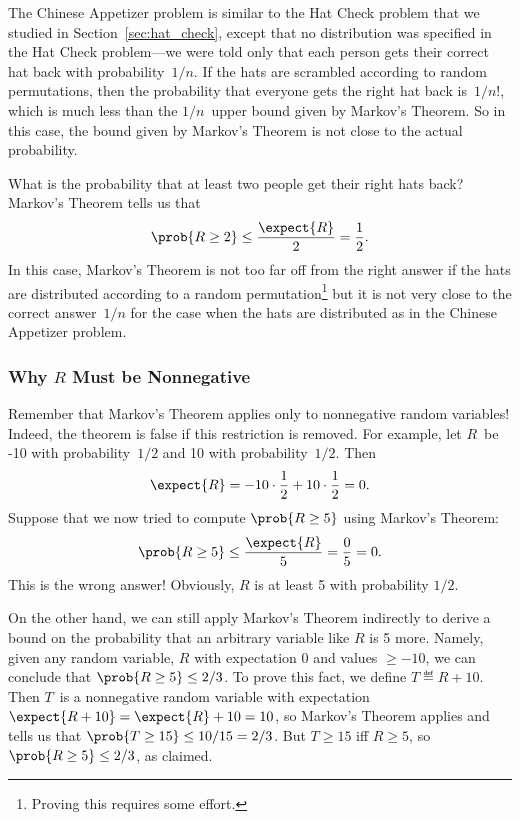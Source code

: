 The Chinese Appetizer problem is similar to the Hat Check problem that
we studied in Section~\ref{sec:hat_check}, except that no distribution
was specified in the Hat Check problem---we were told only that each
person gets their correct hat back with probability~$1/n$.  If the
hats are scrambled according to random permutations, then the
probability that everyone gets the right hat back is~$1/n!$, which is
much less than the $1/n$~upper bound given by Markov's Theorem.  So in
this case, the bound given by Markov's Theorem is not close to the
actual probability.

What is the probability that at least two people get their right hats
back?  Markov's Theorem tells us that
\begin{equation*}
    \prob{R \ge 2} \le \frac{\expect{R}}{2} = \frac{1}{2}.
\end{equation*}
In this case, Markov's Theorem is not too far off from the right
answer if the hats are distributed according to a random
permutation\footnote{Proving this requires some effort.} but it is not
very close to the correct answer~$1/n$ for the case when the hats are
distributed as in the Chinese Appetizer problem.

\subsubsection{Why $R$ Must be Nonnegative}

Remember that Markov's Theorem applies only to nonnegative random
variables!  Indeed, the theorem is false if this restriction is
removed.  For example, let $R$~be -10 with probability~$1/2$ and 10
with probability~$1/2$.  Then
\[
\expect{R} = -10 \cdot \frac{1}{2} + 10 \cdot \frac{1}{2} = 0.
\]
Suppose that we now tried to compute $\prob{R \geq 5}$ using Markov's
Theorem:
\begin{equation*}
  \prob{R \geq 5} \leq \frac{\expect{R}}{5} = \frac{0}{5} = 0.
\end{equation*}
This is the wrong answer!  Obviously, $R$ is at least 5 with
probability $1/2$.

On the other hand, we can still apply Markov's Theorem indirectly to
derive a bound on the probability that an arbitrary variable like $R$
is 5 more.  Namely, given any random variable, $R$ with expectation 0
and values $\geq -10$, we can conclude that $\prob{R \geq 5} \le 2/3$.
To prove this fact, we define $T \eqdef R+10$.  Then $T$~is a
nonnegative random variable with expectation $\expect{R + 10} =
\expect{R}+10= 10$, so Markov's Theorem applies and tells us that
$\prob{T \geq 15} \le 10/15 = 2/3$.  But $T \geq 15$ iff $R \geq 5$, so
$\prob{R \geq 5} \leq 2/3$, as claimed.

